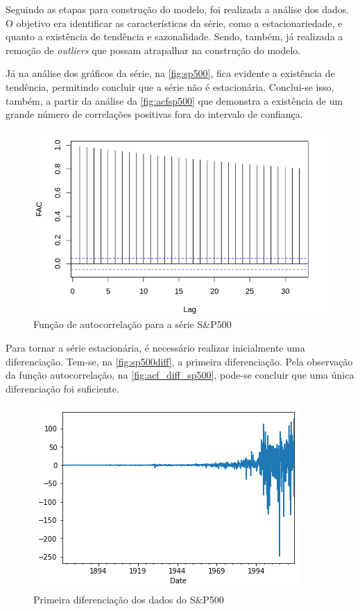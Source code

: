 \documentclass[
    12pt,
    oneside,
    a4paper,
    english,
    brazil
]{abntex2}
\begin{document}
Seguindo  as etapas  para construção  do modelo,  foi realizada  a análise  dos
dados.  O  objetivo  era  identificar  as  características  da  série,  como  a
estacionariedade, e  quanto a  existência de  tendência e  sazonalidade. Sendo,
também, já  realizada a remoção  de \textit{outliers} que possam  atrapalhar na
construção do modelo.

Já na  análise dos gráficos da  série, na \autoref{fig:sp500}, fica  evidente a
existência de  tendência, permitindo concluir  que a série não  é estacionária.
Conclui-se  isso, também,  a partir  da análise  da \autoref{fig:acfsp500}  que
demonstra a  existência de um  grande número  de correlações positivas  fora do
intervalo de confiança.

\begin{figure}[ht]
    \centering
    \caption{Função de autocorrelação para a série S\&P500}\label{fig:acfsp500}
    \includegraphics[width=.5\linewidth]{images/SP500_FAC.png}
\end{figure}

Para  tornar  a série  estacionária,  é  necessário realizar  inicialmente  uma
diferenciação.  Tem-se, na  \autoref{fig:sp500diff}, a  primeira diferenciação.
Pela  observação  da  função autocorrelação,  na  \autoref{fig:acf_diff_sp500},
pode-se concluir que uma única diferenciação foi suficiente.

\begin{figure}[ht]
    \centering
    \caption{Primeira diferenciação dos dados do S\&P500}\label{fig:sp500diff}
    \includegraphics[width=.5\linewidth]{images/sp500diff.png}
\end{figure}
\end{document}
